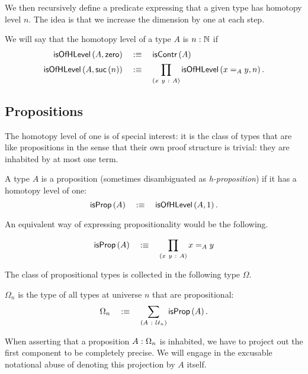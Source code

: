 We then recursively define a predicate expressing that a given type has homotopy level
$n$. The idea is that we increase the dimension by one at each step.
\begin{defn}
  We will say that the homotopy level of a type $A$ is $n\hspace{0.1mm}:\hspace{0.1mm}\mathbb{N}$ if
  \begin{align*}
    \mathsf{isOfHLevel}\left(A, \mathsf{zero}{}\right) &\quad:\equiv\quad \mathsf{isContr}\left(A\right)\\
    \mathsf{isOfHLevel}\left(A, \mathsf{suc}\left(n\right)\right) &\quad:\equiv\quad \prod_{(x~y~:~A)} \mathsf{isOfHLevel}\left(x =_A y, n\right).
  \end{align*}
\end{defn}

\subsection{Propositions}

The homotopy level of one is of special interest: it is the class of types that are like
propositions in the sense that their own proof structure is trivial: they are inhabited by
at most one term.

\begin{defn}[Proposition]\label{defn:prop'}
  A type $A$ is a proposition (sometimes disambiguated as \emph{h-proposition}) if it has
  a homotopy level of one:
  \begin{equation*}
    \mathsf{isProp}\left(A\right) \quad:\equiv\quad \mathsf{isOfHLevel}\left(A, 1\right).
  \end{equation*}
\end{defn}

An equivalent way of expressing propositionality would be the following.
\begin{defn}\label{defn:prop}
  \begin{equation*}
    \mathsf{isProp}\left(A\right) \quad:\equiv\quad \prod_{(x~y~:~A)} x =_A y
  \end{equation*}
\end{defn}

The class of propositional types is collected in the following type $\Omega$.
\begin{defn}[$\Omega$]
  $\Omega_n$ is the type of all types at universe $n$ that are propositional:
  \begin{equation*}
    \Omega_n \quad:\equiv\quad \sum_{(A~:~\mathcal{U}{}_n)} \mathsf{isProp}\left(A\right).
  \end{equation*}
\end{defn}

When asserting that a proposition $A\hspace{0.1mm}:\hspace{0.1mm}\Omega_n$ is inhabited, we have to project out
the first component to be completely precise. We will engage in the excusable notational
abuse of denoting this projection by $A$ itself.

